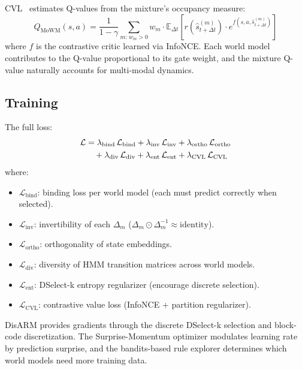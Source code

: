 \documentclass[journal]{IEEEtai}
\begin{document}
CVL~\cite{mazoure2022contrastive} estimates Q-values from the mixture's occupancy measure:
\begin{equation}
Q_\mathrm{MoWM}(s, a) = \frac{1}{1-\gamma} \sum_{m:\, w_m > 0} w_m \cdot \mathbb{E}_{\Delta t}\!\left[r(\hat{s}_{t+\Delta t}^{(m)}) \cdot e^{f(s, a, \hat{s}_{t+\Delta t}^{(m)})}\right]
\end{equation}
where $f$ is the contrastive critic learned via InfoNCE. Each world model contributes to the Q-value proportional to its gate weight, and the mixture Q-value naturally accounts for multi-modal dynamics.

\subsection{Training}

The full loss:
\begin{align}
\mathcal{L} &= \lambda_\mathrm{bind}\, \mathcal{L}_\mathrm{bind} + \lambda_\mathrm{inv}\, \mathcal{L}_\mathrm{inv} + \lambda_\mathrm{ortho}\, \mathcal{L}_\mathrm{ortho} \notag \\
&\quad + \lambda_\mathrm{div}\, \mathcal{L}_\mathrm{div} + \lambda_\mathrm{ent}\, \mathcal{L}_\mathrm{ent} + \lambda_\mathrm{CVL}\, \mathcal{L}_\mathrm{CVL}
\end{align}
where:
\begin{itemize}
\item $\mathcal{L}_\mathrm{bind}$: binding loss per world model (each must predict correctly when selected).
\item $\mathcal{L}_\mathrm{inv}$: invertibility of each $\Delta_m$ ($\Delta_m \odot \Delta_m^{-1} \approx \mathrm{identity}$).
\item $\mathcal{L}_\mathrm{ortho}$: orthogonality of state embeddings.
\item $\mathcal{L}_\mathrm{div}$: diversity of HMM transition matrices across world models.
\item $\mathcal{L}_\mathrm{ent}$: DSelect-k entropy regularizer (encourage discrete selection).
\item $\mathcal{L}_\mathrm{CVL}$: contrastive value loss (InfoNCE + partition regularizer).
\end{itemize}

DisARM provides gradients through the discrete DSelect-k selection and block-code discretization. The Surprise-Momentum optimizer modulates learning rate by prediction surprise, and the bandits-based rule explorer determines which world models need more training data.
\end{document}
